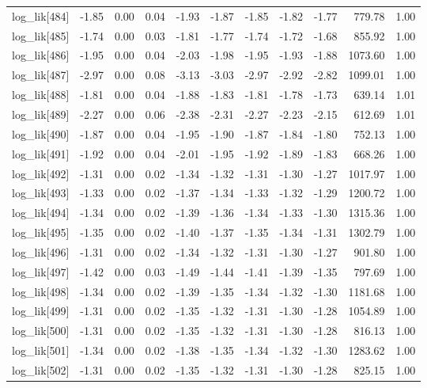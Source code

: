 \begin{table}[ht]
\begin{tabular}{rrrrrrrrrrr}
  log\_lik[484] & -1.85 & 0.00 & 0.04 & -1.93 & -1.87 & -1.85 & -1.82 & -1.77 & 779.78 & 1.00 \\ 
  log\_lik[485] & -1.74 & 0.00 & 0.03 & -1.81 & -1.77 & -1.74 & -1.72 & -1.68 & 855.92 & 1.00 \\ 
  log\_lik[486] & -1.95 & 0.00 & 0.04 & -2.03 & -1.98 & -1.95 & -1.93 & -1.88 & 1073.60 & 1.00 \\ 
  log\_lik[487] & -2.97 & 0.00 & 0.08 & -3.13 & -3.03 & -2.97 & -2.92 & -2.82 & 1099.01 & 1.00 \\ 
  log\_lik[488] & -1.81 & 0.00 & 0.04 & -1.88 & -1.83 & -1.81 & -1.78 & -1.73 & 639.14 & 1.01 \\ 
  log\_lik[489] & -2.27 & 0.00 & 0.06 & -2.38 & -2.31 & -2.27 & -2.23 & -2.15 & 612.69 & 1.01 \\ 
  log\_lik[490] & -1.87 & 0.00 & 0.04 & -1.95 & -1.90 & -1.87 & -1.84 & -1.80 & 752.13 & 1.00 \\ 
  log\_lik[491] & -1.92 & 0.00 & 0.04 & -2.01 & -1.95 & -1.92 & -1.89 & -1.83 & 668.26 & 1.00 \\ 
  log\_lik[492] & -1.31 & 0.00 & 0.02 & -1.34 & -1.32 & -1.31 & -1.30 & -1.27 & 1017.97 & 1.00 \\ 
  log\_lik[493] & -1.33 & 0.00 & 0.02 & -1.37 & -1.34 & -1.33 & -1.32 & -1.29 & 1200.72 & 1.00 \\ 
  log\_lik[494] & -1.34 & 0.00 & 0.02 & -1.39 & -1.36 & -1.34 & -1.33 & -1.30 & 1315.36 & 1.00 \\ 
  log\_lik[495] & -1.35 & 0.00 & 0.02 & -1.40 & -1.37 & -1.35 & -1.34 & -1.31 & 1302.79 & 1.00 \\ 
  log\_lik[496] & -1.31 & 0.00 & 0.02 & -1.34 & -1.32 & -1.31 & -1.30 & -1.27 & 901.80 & 1.00 \\ 
  log\_lik[497] & -1.42 & 0.00 & 0.03 & -1.49 & -1.44 & -1.41 & -1.39 & -1.35 & 797.69 & 1.00 \\ 
  log\_lik[498] & -1.34 & 0.00 & 0.02 & -1.39 & -1.35 & -1.34 & -1.32 & -1.30 & 1181.68 & 1.00 \\ 
  log\_lik[499] & -1.31 & 0.00 & 0.02 & -1.35 & -1.32 & -1.31 & -1.30 & -1.28 & 1054.89 & 1.00 \\ 
  log\_lik[500] & -1.31 & 0.00 & 0.02 & -1.35 & -1.32 & -1.31 & -1.30 & -1.28 & 816.13 & 1.00 \\ 
  log\_lik[501] & -1.34 & 0.00 & 0.02 & -1.38 & -1.35 & -1.34 & -1.32 & -1.30 & 1283.62 & 1.00 \\ 
  log\_lik[502] & -1.31 & 0.00 & 0.02 & -1.35 & -1.32 & -1.31 & -1.30 & -1.28 & 825.15 & 1.00 \\ 

\end{tabular}
\end{table}
